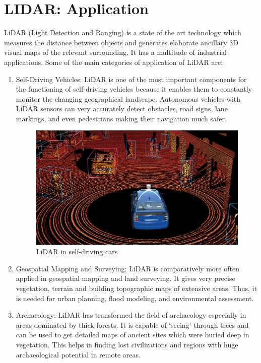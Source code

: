 \documentclass{article}
\begin{document}
\section{LIDAR: Application}
LiDAR (Light Detection and Ranging) is a state of the art technology which measures the distance between objects and generates elaborate ancillary 3D visual maps of the relevant surrounding. It has a multitude of industrial applications. Some of the main categories of application of LiDAR are:
\begin{enumerate}
    \item Self-Driving Vehicles: LiDAR is one of the most important components for the functioning of self-driving vehicles because it enables them to constantly monitor the changing geographical landscape. Autonomous vehicles with LiDAR sensors can very accurately detect obstacles, road signs, lane markings, and even pedestrians making their navigation much safer. \cite{10192716}
\begin{figure}[h!]
\centering
\includegraphics[width=1\textwidth]{selfdrive.jpg}
\caption{\label{fig:xrd}LiDAR in self-driving cars\cite{voyageIntroductionLIDAR}}
\end{figure}
    \item Geospatial Mapping and Surveying: LiDAR is comparatively more often applied in geospatial mapping and land surveying. It gives very precise vegetation, terrain and building topographic maps of extensive areas. Thus, it is needed for urban planning, flood modeling, and environmental assessment.\cite{7866543}
    \item Archaeology: LiDAR has transformed the field of archaeology especially in areas dominated by thick forests. It is capable of ‘seeing’ through trees and can be used to get detailed maps of ancient sites which were buried deep in vegetation. This helps in finding lost civilizations and regions with huge archaeological potential in remote areas.\cite{10167652}

\end{enumerate}
\end{document}
